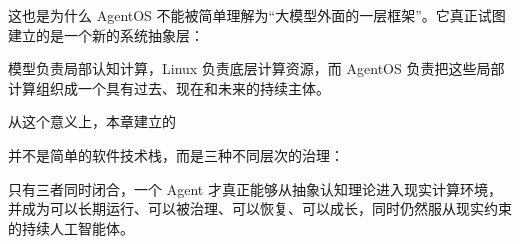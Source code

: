 这也是为什么 AgentOS 不能被简单理解为“大模型外面的一层框架”。它真正试图建立的是一个新的系统抽象层：

\begin{statementbox}
\centering
{}
\end{statementbox}

模型负责局部认知计算，Linux 负责底层计算资源，而 AgentOS 负责把这些局部计算组织成一个具有过去、现在和未来的持续主体。

从这个意义上，本章建立的
\begin{statementbox}
\centering
{}
\end{statementbox}
并不是简单的软件技术栈，而是三种不同层次的治理：

\begin{statementbox}
\centering
{}
\end{statementbox}

只有三者同时闭合，一个 Agent 才真正能够从抽象认知理论进入现实计算环境，并成为可以长期运行、可以被治理、可以恢复、可以成长，同时仍然服从现实约束的持续人工智能体。
